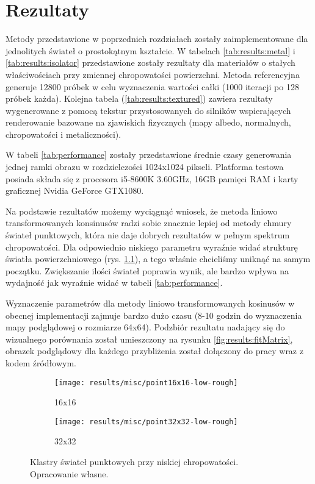 \documentclass[../main.tex]{subfiles}
\begin{document}
\chapter{Rezultaty}

Metody przedstawione w poprzednich rozdziałach zostały zaimplementowane dla jednolitych świateł o prostokątnym kształcie. W tabelach \ref{tab:results:metal} i \ref{tab:results:isolator} przedstawione zostały rezultaty dla materiałów o stałych właściwościach przy zmiennej chropowatości powierzchni. Metoda referencyjna generuje 12800 próbek w celu wyznaczenia wartości całki (1000 iteracji po 128 próbek każda). Kolejna tabela (\ref{tab:results:textured}) zawiera rezultaty wygenerowane z pomocą tekstur przystosowanych do silników wspierających renderowanie bazowane na zjawiskich fizycznych (mapy albedo, normalnych, chropowatości i metaliczności).

W tabeli \ref{tab:performance} zostały przedstawione średnie czasy generowania jednej ramki obrazu w rozdzielczości 1024x1024 pikseli. Platforma testowa posiada składa się z procesora i5-8600K 3.60GHz, 16GB pamięci RAM i karty graficznej Nvidia GeForce GTX1080.

Na podstawie rezultatów możemy wyciągnąć wniosek, że metoda liniowo transformowanych konsinusów radzi sobie znacznie lepiej od metody chmury świateł punktowych, która nie daje dobrych rezultatów w pełnym spektrum chropowatości. Dla odpowiednio niskiego parametru wyraźnie widać strukturę światła powierzchniowego (rys. \ref{fig:results:pointManyLowAlpha}), a tego właśnie chcieliśmy uniknąć na samym początku. Zwiększanie ilości świateł poprawia wynik, ale bardzo wpływa na wydajność jak wyraźnie widać w tabeli \ref{tab:performance}.

Wyznaczenie parametrów dla metody liniowo transformowanych kosinusów w obecnej implementacji zajmuje bardzo dużo czasu (8-10 godzin do wyznaczenia mapy podglądowej o rozmiarze 64x64). Podzbiór rezultatu nadający się do wizualnego porównania został umieszczony na rysunku \ref{fig:results:fitMatrix}, obrazek podglądowy dla każdego przybliżenia został dołączony do pracy wraz z kodem źródłowym.

\begin{figure}
    \centering
    \begin{subfigure}{0.45\textwidth}
        \texttt{[image: results/misc/point16x16-low-rough]}
        \caption{16x16}
    \end{subfigure}
    \begin{subfigure}{0.45\textwidth}
        \texttt{[image: results/misc/point32x32-low-rough]}
        \caption{32x32}
    \end{subfigure}
    \caption{Klastry świateł punktowych przy niskiej chropowatości. Opracowanie własne.}
    \label{fig:results:pointManyLowAlpha}
\end{figure}
\end{document}
